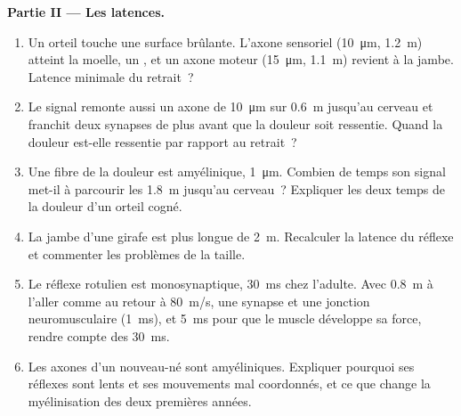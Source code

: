 \begin{problem}
\medskip
\noindent\textbf{Partie II --- Les latences.}
\begin{enumerate}[resume]
  \item Un orteil touche une surface brûlante. L'axone sensoriel
        (\qty{10}{\micro m}, \qty{1.2}{m}) atteint la moelle, un
        , et un axone moteur (\qty{15}{\micro m},
        \qty{1.1}{m}) revient à la jambe. Latence minimale du retrait~?
  \item Le signal remonte aussi un axone de \qty{10}{\micro m} sur
        \qty{0.6}{m} jusqu'au cerveau et franchit deux synapses de plus
        avant que la douleur soit ressentie. Quand la douleur est-elle
        ressentie par rapport au retrait~?
  \item Une fibre de la douleur est amyélinique, \qty{1}{\micro m}.
        Combien de temps son signal met-il à parcourir les \qty{1.8}{m}
        jusqu'au cerveau~? Expliquer les deux temps de la douleur d'un
        orteil cogné.
  \item La jambe d'une girafe est plus longue de \qty{2}{m}. Recalculer
        la latence du réflexe et commenter les problèmes de la taille.
  \item Le réflexe rotulien est monosynaptique, \qty{30}{ms} chez
        l'adulte. Avec \qty{0.8}{m} à l'aller comme au retour à
        \qty{80}{m/s}, une synapse et une jonction neuromusculaire
        (\qty{1}{ms}), et \qty{5}{ms} pour que le muscle développe sa
        force, rendre compte des \qty{30}{ms}.
  \item Les axones d'un nouveau-né sont amyéliniques. Expliquer pourquoi
        ses réflexes sont lents et ses mouvements mal coordonnés, et ce
        que change la myélinisation des deux premières années.
\end{enumerate}


\end{problem}
